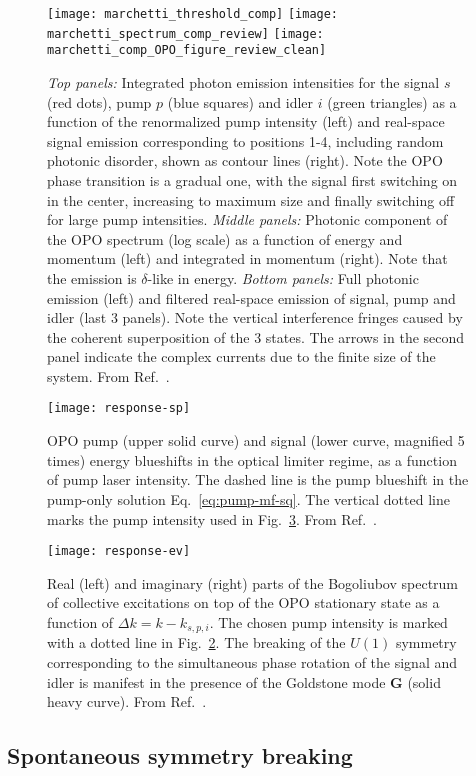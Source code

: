 %
\begin{figure}[tb]\centering
  \texttt{[image: marchetti\_threshold\_comp]}
  \texttt{[image: marchetti\_spectrum\_comp\_review]}
  \texttt{[image: marchetti\_comp\_OPO\_figure\_review\_clean]}
  \caption{
    \emph{Top panels:} Integrated photon emission intensities for the signal $s$ (red dots), pump $p$ (blue squares) and idler $i$ (green triangles) as a function of the renormalized pump intensity (left) and real-space signal emission corresponding to positions 1-4, including random photonic disorder, shown as contour lines (right). Note the OPO phase transition is a gradual one, with the signal first switching on in the center, increasing to maximum size and finally switching off for large pump intensities.
    \emph{Middle panels:} Photonic component of the OPO spectrum (log scale) as a function of energy and momentum (left) and integrated in momentum (right). Note that the emission is $\delta$-like in energy.
    \emph{Bottom panels:} Full photonic emission (left) and filtered real-space emission of signal, pump and idler (last 3 panels). Note the vertical interference fringes caused by the coherent superposition of the 3 states. The arrows in the second panel indicate the complex currents due to the finite size of the system.
    From Ref.~\cite{9783642241857}.
  }\label{fig:marchetti}
\end{figure}
% 


%
\begin{figure}[tb]\centering
  \texttt{[image: response-sp]}
  \caption{
    OPO pump (upper solid curve) and signal (lower curve, magnified 5 times) energy blueshifts in the optical limiter regime, as a function of pump laser intensity. The dashed line is the pump blueshift in the pump-only solution Eq.~\eqref{eq:pump-mf-sq}. The vertical dotted line marks the pump intensity used in Fig.~\ref{fig:goldstone}.
    From Ref.~\cite{Wouters_2007}.
  }\label{fig:spi}
\end{figure}
% 

%
\begin{figure}[tb]\centering
  \texttt{[image: response-ev]}
  \caption{
    Real (left) and imaginary (right) parts of the Bogoliubov spectrum of collective excitations on top of the OPO stationary state as a function of $\Delta k = k - k_{s,p,i}$. The chosen pump intensity is marked with a dotted line in Fig.~\ref{fig:spi}. The breaking of the $U(1)$ symmetry corresponding to the simultaneous phase rotation of the signal and idler is manifest in the presence of the Goldstone mode \textbf{G} (solid heavy curve). From Ref.~\cite{Wouters_2007}.
  }\label{fig:goldstone}
\end{figure}
% 









\subsection{Spontaneous symmetry breaking}
 

